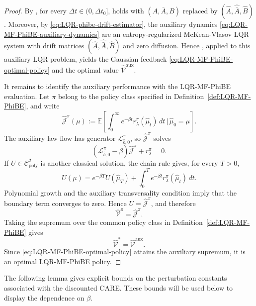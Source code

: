 \documentclass[a4paper, 10pt, english, reqno]{amsart}
\begin{document}
\begin{proof}
By , for every $\Delta t\in(0,\Delta t_0]$,  holds with $(A,\bar A,B)$ replaced by $(\hat A,\hat{\bar A},\hat B)$. Moreover, by \eqref{eq:LQR-phibe-drift-estimator}, the auxiliary dynamics \eqref{eq:LQR-MF-PhiBE-auxiliary-dynamics} are an entropy-regularized McKean-Vlasov LQR system with drift matrices $(\hat A,\hat{\bar A},\hat B)$ and zero diffusion. Hence , applied to this auxiliary LQR problem, yields the Gaussian feedback \eqref{eq:LQR-MF-PhiBE-optimal-policy} and the optimal value $\widehat{\mathcal V}^{\mathrm{aux}}$.

It remains to identify the auxiliary performance with the LQR-MF-PhiBE
evaluation. Let $\pi$ belong to the policy class specified in
Definition~\ref{def:LQR-MF-PhiBE}, and write
\[
\widehat{\mathcal J}^{\pi}(\mu)
:=
\mathbb E\left[
\int_0^\infty e^{-\beta t}r_\lambda^\pi(\hat\mu_t)\,dt
\,\bigg|\,
\hat\mu_0=\mu
\right].
\]
The auxiliary law flow has generator
$\mathcal L_{\hat b,0}^{\pi}$, so
$\widehat{\mathcal J}^{\pi}$ solves
\[
(\mathcal L_{\hat b,0}^{\pi}-\beta)
\widehat{\mathcal J}^{\pi}+r_\lambda^\pi=0.
\]
If $U\in\mathcal C^2_{\mathrm{poly}}$ is another classical solution,
the chain rule gives, for every $T>0$,
\[
U(\mu)
=
e^{-\beta T}U(\hat\mu_T)
+
\int_0^T e^{-\beta t}r_\lambda^\pi(\hat\mu_t)\,dt.
\]
Polynomial growth and the auxiliary transversality condition imply that
the boundary term converges to zero. Hence
$U=\widehat{\mathcal J}^{\pi}$, and therefore
\[
\hat{\mathcal V}^{\pi}=\widehat{\mathcal J}^{\pi}.
\]
Taking the supremum over the common policy class in
Definition~\ref{def:LQR-MF-PhiBE} gives
\[
\hat{\mathcal V}^*=\widehat{\mathcal V}^{\mathrm{aux}}.
\]
Since \eqref{eq:LQR-MF-PhiBE-optimal-policy} attains the auxiliary
supremum, it is an optimal LQR-MF-PhiBE policy.
\end{proof}


The following lemma gives explicit bounds on the perturbation constants associated with the discounted CARE. These bounds will be used below to display the dependence on $\beta$.
\end{document}

